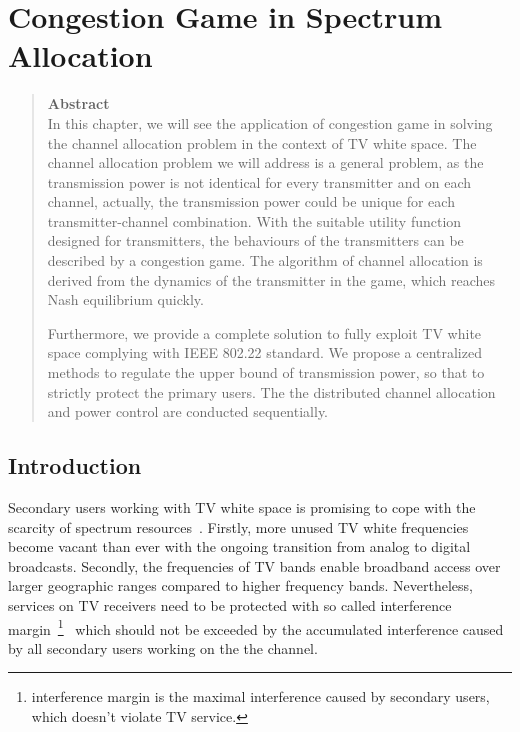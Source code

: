 \chapter{Congestion Game in Spectrum Allocation}

\begin{quote}
{\textbf{Abstract}\\
\small In this chapter, we will see the application of congestion game in solving the channel allocation problem in the context of TV white space.
The channel allocation problem we will address is a general problem, as the transmission power is not identical for every transmitter and on each channel, actually, the transmission power could be unique for each transmitter-channel combination.
With the suitable utility function designed for transmitters, the behaviours of the transmitters can be described by a congestion game.
The algorithm of channel allocation is derived from the dynamics of the transmitter in the game, which reaches Nash equilibrium quickly.

Furthermore, we provide a complete solution to fully exploit TV white space complying with IEEE 802.22 standard.
We propose a centralized methods to regulate the upper bound of transmission power, so that to strictly protect the primary users.
The the distributed channel allocation and power control are conducted sequentially.
}
\end{quote}

\section{Introduction}




Secondary users working with TV white space is promising to cope with the scarcity of spectrum resources~\cite{FCC_2010_sedond_memorandumm}. 
Firstly, more unused TV white frequencies become vacant than ever with the ongoing transition from analog to digital broadcasts. Secondly, the frequencies of TV bands enable broadband access over larger geographic ranges compared to higher frequency bands. Nevertheless, services on TV receivers need to be protected with so called interference margin~\footnote{interference margin is the maximal interference caused by secondary users, which doesn't violate TV service.}~\cite{multipleIntf_pimrc11} which should not be exceeded by the accumulated interference caused by all secondary users working on the the channel.


